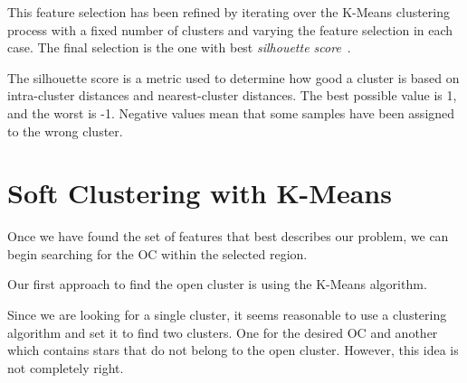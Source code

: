 \documentclass[11pt, a4paper, english]{book}
\begin{document}
This feature selection has been refined by iterating over the K-Means clustering process
with a fixed number of clusters and varying the feature selection in each case.
The final selection is the one with best \emph{silhouette score}~\cite{rousseeuw1987silhouettes}.

The silhouette score is a metric used to determine how good a cluster is based on intra-cluster
distances and nearest-cluster distances. The best possible value is 1, and the worst is -1.
Negative values mean that some samples have been assigned to the wrong cluster.

\section{Soft Clustering with K-Means}

Once we have found the set of features that best describes our problem,
we can begin searching for the OC within the selected region.

Our first approach to find the open cluster is using the K-Means algorithm.

Since we are looking for a single cluster,
it seems reasonable to use a clustering algorithm and set it to find two clusters.
One for the desired OC and another which contains stars that do not belong to the open cluster.
However, this idea is not completely right.
\end{document}

